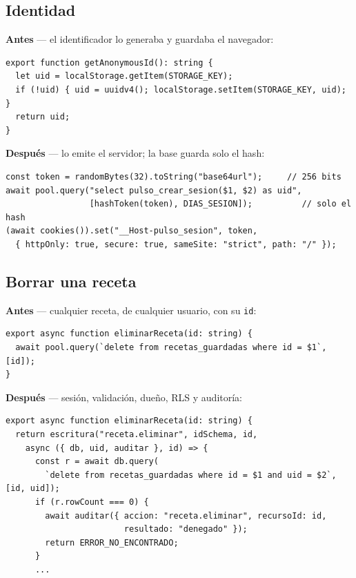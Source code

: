 \documentclass[11pt,letterpaper]{article}
\newcommand{\cod}[1]{\texttt{#1}}
\begin{document}
\subsection*{Identidad}
\noindent\begin{minipage}{\linewidth}
\noindent\textbf{\color{antes}Antes} — el identificador lo generaba y guardaba el navegador:
\begin{lstlisting}[style=antes]
export function getAnonymousId(): string {
  let uid = localStorage.getItem(STORAGE_KEY);
  if (!uid) { uid = uuidv4(); localStorage.setItem(STORAGE_KEY, uid); }
  return uid;
}
\end{lstlisting}
\end{minipage}\par\vspace{4pt}
\noindent\begin{minipage}{\linewidth}
\noindent\textbf{\color{despues}Después} — lo emite el servidor; la base guarda solo el hash:
\begin{lstlisting}[style=despues]
const token = randomBytes(32).toString("base64url");     // 256 bits
await pool.query("select pulso_crear_sesion($1, $2) as uid",
                 [hashToken(token), DIAS_SESION]);          // solo el hash
(await cookies()).set("__Host-pulso_sesion", token,
  { httpOnly: true, secure: true, sameSite: "strict", path: "/" });
\end{lstlisting}
\end{minipage}\par\vspace{4pt}

\subsection*{Borrar una receta}
\noindent\begin{minipage}{\linewidth}
\noindent\textbf{\color{antes}Antes} — cualquier receta, de cualquier usuario, con su \cod{id}:
\begin{lstlisting}[style=antes]
export async function eliminarReceta(id: string) {
  await pool.query(`delete from recetas_guardadas where id = $1`, [id]);
}
\end{lstlisting}
\end{minipage}\par\vspace{4pt}
\noindent\begin{minipage}{\linewidth}
\noindent\textbf{\color{despues}Después} — sesión, validación, dueño, RLS y auditoría:
\begin{lstlisting}[style=despues]
export async function eliminarReceta(id: string) {
  return escritura("receta.eliminar", idSchema, id,
    async ({ db, uid, auditar }, id) => {
      const r = await db.query(
        `delete from recetas_guardadas where id = $1 and uid = $2`, [id, uid]);
      if (r.rowCount === 0) {
        await auditar({ accion: "receta.eliminar", recursoId: id,
                        resultado: "denegado" });
        return ERROR_NO_ENCONTRADO;
      }
      ...
\end{lstlisting}
\end{minipage}\par\vspace{4pt}
\end{document}
